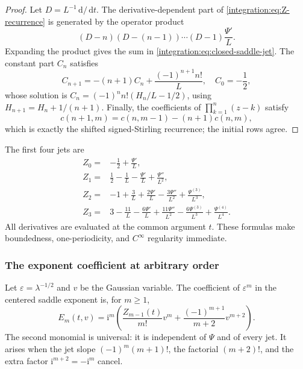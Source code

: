 \documentclass[11pt,oneside]{article}
\theoremstyle{definition}
\theoremstyle{remark}
\newcommand{\ii}{\mathrm i}
\newcommand{\dd}{\,\mathrm d}
\begin{document}
\begin{proof}
Let $D=L^{-1}\dd/\dd t$.  The derivative-dependent part of
\eqref{integration:eq:Z-recurrence} is generated by the operator product
\begin{equation}
 (D-n)(D-(n-1))\cdots(D-1)\frac{\Psi'}L.
 \label{integration:eq:jet-operator-product}
\end{equation}
Expanding the product gives the sum in \eqref{integration:eq:closed-saddle-jet}.  The constant part
$C_n$ satisfies
\begin{equation}
 C_{n+1}=-(n+1)C_n+\frac{(-1)^{n+1}n!}{L},
 \quad C_0=-\frac12,
 \label{integration:eq:jet-constant-recurrence}
\end{equation}
whose solution is $C_n=(-1)^nn!(H_n/L-1/2)$, using
$H_{n+1}=H_n+1/(n+1)$.  Finally, the coefficients of
$\prod_{k=1}^{n}(z-k)$ satisfy
\begin{equation}
 c(n+1,m)=c(n,m-1)-(n+1)c(n,m),
 \label{integration:eq:c-stirling-recurrence}
\end{equation}
which is exactly the shifted signed-Stirling recurrence; the initial rows agree.
\end{proof}

The first four jets are
\begin{align}
 Z_0={}&-\frac12+\frac{\Psi'}L,                              \label{integration:eq:Z0-explicit}\\
 Z_1={}&\frac12-\frac1L-\frac{\Psi'}L+\frac{\Psi''}{L^2},  \label{integration:eq:Z1-explicit}\\
 Z_2={}&-1+\frac3L+\frac{2\Psi'}L-\frac{3\Psi''}{L^2}
             +\frac{\Psi^{(3)}}{L^3},                       \label{integration:eq:Z2-explicit}\\
 Z_3={}&3-\frac{11}{L}-\frac{6\Psi'}L+\frac{11\Psi''}{L^2}
             -\frac{6\Psi^{(3)}}{L^3}+\frac{\Psi^{(4)}}{L^4}.
                                                                    \label{integration:eq:Z3-explicit}
\end{align}
All derivatives are evaluated at the common argument $t$.  These formulas make boundedness,
one-periodicity, and $C^\infty$ regularity immediate.

\subsubsection{The exponent coefficient at arbitrary order}

Let $\varepsilon=\lambda^{-1/2}$ and $v$ be the Gaussian variable.  The coefficient of
$\varepsilon^m$ in the centered saddle exponent is, for $m\ge1$,
\begin{equation}
 E_m(t,v)=\ii^m\left(
 \frac{Z_{m-1}(t)}{m!}v^m
 +\frac{(-1)^{m+1}}{m+2}v^{m+2}
\right).
 \label{integration:eq:closed-exponent-coefficient}
\end{equation}
The second monomial is universal: it is independent of $\Psi$ and of every jet.  It arises
when the jet slope $(-1)^{m}(m+1)!$, the factorial $(m+2)!$, and the extra factor
$\ii^{m+2}=-\ii^m$ cancel.
\end{document}
